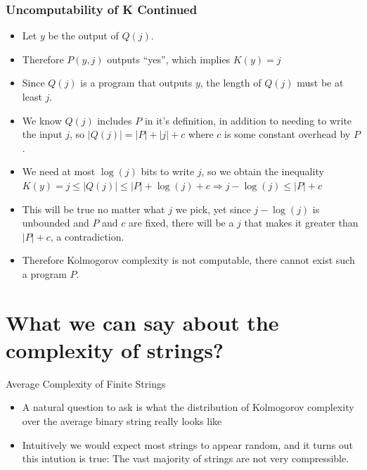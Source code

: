\documentclass[aspectratio=169]{beamer}
\begin{document}
\begin{frame}
  \frametitle{Uncomputability of K Continued}
  \begin{pf}
    \begin{itemize}
        \item Let $y$ be the output of $Q(j)$. \pause
        \item Therefore $P(y, j)$ outputs ``yes'', which implies $K(y) = j$ \pause
        \item Since $Q(j)$ is a program that outputs $y$, the length of $Q(j)$ must be at least $j$. \pause
        \item We know $Q(j)$ includes $P$ in it's definition, in addition to needing to write the input $j$, so $|Q(j)| = |P| + |j| + c$ where $c$ is some constant overhead by $P$. \pause
        \item We need at most $\log(j)$ bits to write $j$, so we obtain the inequality $K(y) = j \leq |Q(j)| \leq |P| + \log(j) + c \Rightarrow j - \log(j) \leq |P| + c$ \pause
        \item This will be true no matter what $j$ we pick, yet since $j - \log(j)$ is unbounded and $P$ and $c$ are fixed, there will be a $j$ that makes it greater than $|P| + c$, a contradiction. \pause
        \item Therefore Kolmogorov complexity is not computable, there cannot exist such a program $P$.
    \end{itemize}
  \end{pf}
\end{frame}

\section{What we can say about the complexity of strings?}
\frame{\sectionpage}

\begin{frame}{Average Complexity of Finite Strings}
  
  \begin{itemize}
    \item A natural question to ask is what the distribution of Kolmogorov complexity over the average binary string really looks like \pause
    \item Intuitively we would expect most strings to appear random, and it turns out this intution is true: The vast majority of strings are not very compressible. 
  \end{itemize}
\end{frame}
\end{document}
